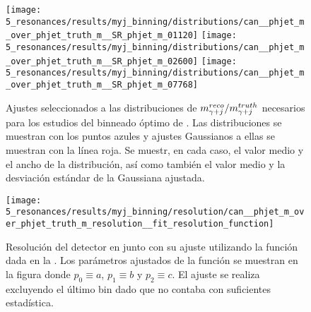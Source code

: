 \begin{figure}[ht!]
    \centering
    \texttt{[image: 5\_resonances/results/myj\_binning/distributions/can\_\_phjet\_m\_over\_phjet\_truth\_m\_\_SR\_phjet\_m\_01120]}
    \hfill
    \texttt{[image: 5\_resonances/results/myj\_binning/distributions/can\_\_phjet\_m\_over\_phjet\_truth\_m\_\_SR\_phjet\_m\_02600]}
    \hfill
    \texttt{[image: 5\_resonances/results/myj\_binning/distributions/can\_\_phjet\_m\_over\_phjet\_truth\_m\_\_SR\_phjet\_m\_07768]}
    \caption{Ajustes seleccionados a las distribuciones de \(m_{\gamma+j}^{reco} / m_{\gamma+j}^{truth}\) necesarios para los estudios del binneado óptimo de \myj. Las distribuciones se muestran con los puntos azules y ajustes Gaussianos a ellas se muestran con la línea roja. Se muestr, en cada caso, el valor medio y el ancho de la distribución, así como también el valor medio y la desviación estándar de la Gaussiana ajustada.}
    \label{fig:results:obs:ratio_fits}
\end{figure}

\begin{figure}[ht!]
    \centering
    \texttt{[image: 5\_resonances/results/myj\_binning/resolution/can\_\_phjet\_m\_over\_phjet\_truth\_m\_resolution\_\_fit\_resolution\_function]}
    \caption{Resolución del detector en \myj junto con su ajuste utilizando la función dada en la \Eqn{\ref{eq:results:obs:binning_resolution}}. Los parámetros ajustados de la función se muestran en la figura donde \(p_0 \equiv a\), \(p_1 \equiv b\) y \(p_2 \equiv c\). El ajuste se realiza excluyendo el último bin dado que no contaba con suficientes estadística.}
    \label{fig:results:obs:resolution_curve}
\end{figure}

